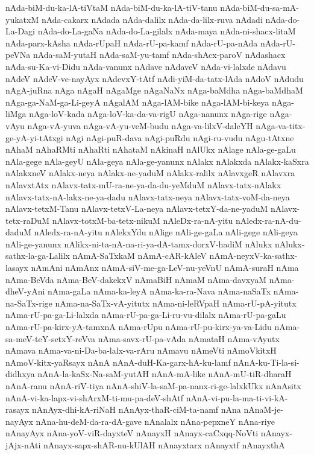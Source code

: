 {nAda-biM-du-ka-lA-tiVtaM
nAda-biM-du-ka-lA-tiV-tanu
nAda-biM-du-sa-mA-yukatxM
nAda-cakarx
nAdada
nAda-dalilx
nAda-da-lilx-ruva
nAdadi
nAda-do-La-Dagi
nAda-do-La-gaNa
nAda-do-La-gilalx
nAda-maya
nAda-ni-shacx-litaM
nAda-parx-kAsha
nAda-rUpaH
nAda-rU-pa-kamf
nAda-rU-pa-nAda
nAda-rU-peVNa
nAda-saM-yutaH
nAda-saM-yu-tamf
nAda-shAcx-paroV
nAdashacx
nAda-su-Ka-vi-Didu
nAda-vanunx
nAdave
nAdaveV
nAda-vi-lalxde
nAdavu
nAdeV
nAdeV-ve-nayAyx
nAdevxY-tAtf
nAdi-yiM-da-tatx-lAda
nAdoV
nAdudu
nAgA-juRna
nAga
nAgaH
nAgaMge
nAgaNaNx
nAga-baMdha
nAga-baMdhaM
nAga-ga-NaM-ga-Li-geyA
nAgalAM
nAga-lAM-bike
nAga-lAM-bi-keya
nAga-liMga
nAga-loV-kada
nAga-loV-ka-da-va-rigU
nAga-nanunx
nAga-rige
nAga-vAyu
nAga-vA-yuva
nAga-vA-yu-veM-budu
nAga-va-lilxV-daleYH
nAga-va-titx-ge-yA-yi-tAtxgi
nAgi
nAgi-puR-dava
nAgi-puRdu
nAgi-ru-vudu
nAgu-tAtxne
nAhaM
nAhaRMti
nAhaRti
nAhataM
nAkinaH
nAlUkx
nAlage
nAla-ge-gaLu
nAla-gege
nAla-geyU
nAla-geya
nAla-ge-yanunx
nAlakx
nAlakxda
nAlakx-kaSxra
nAlakxneV
nAlakx-neya
nAlakx-ne-yaduM
nAlakx-ralilx
nAlavxgeR
nAlavxra
nAlavxtAtx
nAlavx-tatx-mU-ra-ne-ya-da-du-yeMduM
nAlavx-tatx-nAlakx
nAlavx-tatx-nA-lakx-ne-ya-dadu
nAlavx-tatx-neya
nAlavx-tatx-voM-da-neya
nAlavx-tetxM-Tanu
nAlavx-tetxV-La-neya
nAlavx-tetxY-da-ne-yaduM
nAlavx-tetx-raDuM
nAlavx-totxM-ba-tetx-nikuM
nAleDx-ra-nA-yitu
nAledx-ra-nA-du-daduM
nAledx-ra-nA-yitu
nAlekxYdu
nAlige
nAli-ge-gaLa
nAli-gege
nAli-geya
nAli-ge-yanunx
nAlikx-ni-ta-nA-na-ri-ya-dA-tamx-dorxV-hadiM
nAlukx
nAlukx-sathx-la-ga-Lalilx
nAmA-SaTxkaM
nAmA-cAR-kAleV
nAmA-neyxV-ka-sathx-lasayx
nAmAni
nAmAnx
nAmA-siV-me-ga-LeV-nu-yeVnU
nAmA-suraH
nAma
nAma-BeVda
nAma-BeV-dakekxV
nAmaBiH
nAmaM
nAma-davxyaM
nAma-dheV-yAni
nAma-gaLa
nAma-ka-leyA
nAma-ka-ra-Nava
nAma-naSaTx
nAma-na-SaTx-rige
nAma-na-SaTx-vA-yitutx
nAma-ni-leRVpaH
nAma-rU-pA-yitutx
nAma-rU-pa-ga-Li-lalxda
nAma-rU-pa-ga-Li-ru-vu-dilalx
nAma-rU-pa-gaLu
nAma-rU-pa-kirx-yA-tamxnA
nAma-rUpu
nAma-rU-pu-kirx-ya-va-Lidu
nAma-sa-meV-teY-setxY-reVva
nAma-savx-rU-pa-vAda
nAmataH
nAma-vAyutx
nAmava
nAma-va-ni-Da-ba-lalx-va-rAru
nAmavu
nAmeVti
nAmoVkitxH
nAmoV-kitx-yaRsayx
nAnA
nAnA-duH-Ka-garx-hA-ku-lamf
nAnA-ku-Ti-la-si-didhxya
nAnA-la-kaSx-Na-saM-yutAH
nAnA-mA-like
nAnA-mU-tiR-dharaH
nAnA-ranu
nAnA-riV-tiya
nAnA-shiV-la-saM-pa-nanx-ri-ge-lalxkUkx
nAnAsitx
nAnA-vi-ka-lapx-vi-shArxM-ti-mu-pa-deV-shAtf
nAnA-vi-pu-la-ma-ti-vi-kA-rasayx
nAnAyx-dhi-kA-riNaH
nAnAyx-thaR-ciM-ta-namf
nAna
nAnaM-je-nayAyx
nAna-hu-deM-da-ra-dA-gave
nAnalalx
nAna-pepxneY
nAna-riye
nAnayAyx
nAna-yoV-viR-dayxteV
nAnayxH
nAnayx-caCxqq-NoVti
nAnayx-jAjx-nAti
nAnayx-sapx-shAR-nu-kUlAH
nAnayxtarx
nAnayxtf
nAnayxthA
}
